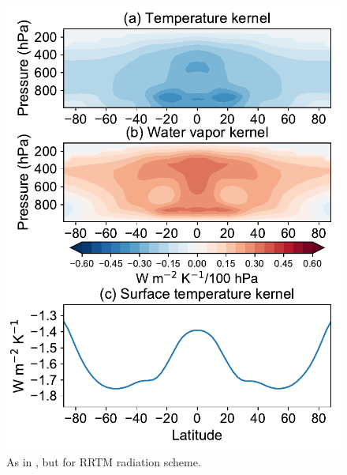 \begin{figure}[ht]
	\centering
	\includegraphics[width=0.45\linewidth]{figs/polar_amp/kernels_rrtm}
	\caption[Annual-mean and zonal-mean temperature, water vapor and surface temperature radiative kernels for RRTM radiation scheme]{As in , but for RRTM radiation scheme.}
	\label{fig:rrtm_kernels}
\end{figure}

